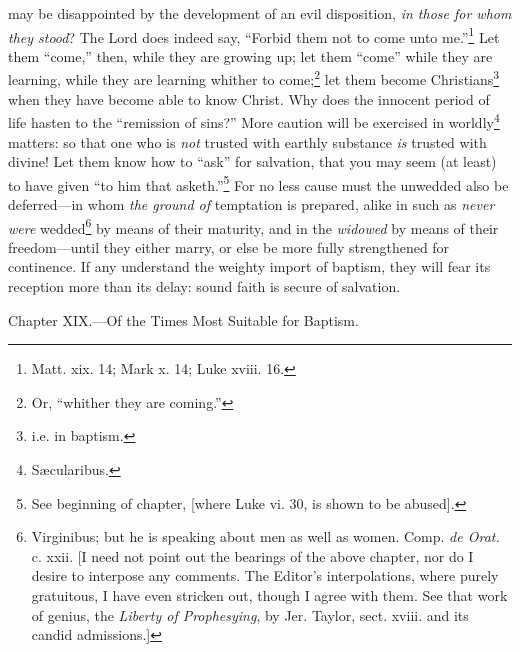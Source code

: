 may be disappointed by the development of an evil disposition, \emph{in those for whom they stood}? The Lord does indeed say, “Forbid them not to come unto me.”\footnote{Matt. xix. 14; Mark x. 14; Luke xviii. 16.} Let them “come,” then, while they are growing up; let them “come” while they are learning, while they are learning whither to come;\footnote{Or, “whither they are coming.”} let them become Christians\footnote{i.e. in baptism.} when they have become able to know Christ. Why does the innocent period of life hasten to the “remission of sins?” More caution will be exercised in worldly\footnote{Sæcularibus.} matters: so that one who is \emph{not} trusted with earthly substance \emph{is} trusted with divine! Let them know how to “ask” for salvation, that you may seem (at least) to have given “to him that asketh.”\footnote{See beginning of chapter, [where Luke vi. 30, is shown to be abused].} For no less cause must the unwedded also be deferred—in whom \emph{the ground of} temptation is prepared, alike in such as \emph{never were} wedded\footnote{Virginibus; but he is speaking about men as well as women. Comp. \emph{de Orat.} c. xxii. [I need not point out the bearings of the above chapter, nor do I desire to interpose any comments. The Editor’s interpolations, where purely gratuitous, I have even stricken out, though I agree with them. See that work of genius, the \emph{Liberty of Prophesying}, by Jer. Taylor, sect. xviii. and its candid admissions.]} by means of their maturity, and in the \emph{widowed} by means of their freedom—until they either marry, or else be more fully strengthened for continence. If any understand the weighty import of baptism, they will fear its reception more than its delay: sound faith is secure of salvation.


Chapter XIX.—Of the Times Most Suitable for Baptism.

